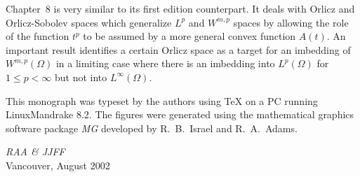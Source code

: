 Chapter~8 is very similar to its first edition counterpart. It deals with Orlicz and 
Orlicz-Sobolev spaces which generalize $L^p$ and $W^{m,p}$ spaces by allowing the role of 
the function $t^p$ to be assumed by a more general convex function $A(t)$. An important result 
identifies a certain Orlicz space as a target for an imbedding of $W^{m,p}(\Omega)$ in a limiting 
case where there is an imbedding into $L^p(\Omega)$ for $1 \leq p<\infty$
but not into $L^{\infty}(\Omega)$.

This monograph was typeset by the authors using \TeX{} on
a PC running LinuxMandrake 8.2. The figures were generated using the mathematical 
graphics software package \textit{MG} developed by R.~B.~Israel and R.~A.~Adams.

\begin{flushleft}
  \textit{RAA \& JJFF} \\
  Vancouver, August 2002
\end{flushleft}